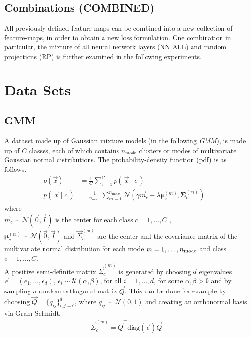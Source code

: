 \subsection{Combinations (COMBINED)}
All previously defined feature-maps can be combined into a new collection of feature-maps,
in order to obtain a new loss formulation.
One combination in particular, the mixture of all neural network layers (NN ALL) and random projections (RP) is further examined in the following experiments.


\section{Data Sets}
\label{sec:datasets}

\subsection{GMM}
\label{sec:datasetgmm}
A dataset made up of Gaussian mixture models (in the following \textit{GMM}), 
is made up of $C$ classes, each of which contains $n_\text{mode}$ clusters or modes of multivariate Gaussian normal distributions. The probability-density function (pdf) is as follows.
\begin{align}
\label{eqn:gmm_distr}
    p(\vec x) &= \frac 1 C \sum_{c=1}^C p(\, \vec x \mid c \,) \nonumber\\
    p(\, \vec x \mid c \,) &= \frac 1 {n_\text{mode}} \sum _{m=1}^{n_\text{mode}}
    \mathcal N (\gamma \vec m_c + \lambda \boldsymbol \mu_c^{(m)}, \boldsymbol \Sigma_c^{(m)}) \, ,
\end{align}
where \\
$\vec m_c \sim \mathcal N (\vec 0, \vec I)$ is the center for each class $c=1,\ldots, C$ ,\\
$\boldsymbol \mu_c^{(m)} \sim \mathcal N (\vec 0, \vec I)$ and
$\vec \Sigma_c^{(m)}$ are the center and the covariance matrix of the multivariate normal distribution
for each mode $m=1,\ldots, n_{\textnormal{mode}}$ and class $c=1,\ldots, C$.  \\
A positive semi-definite matrix $\vec \Sigma_c^{(m)}$ is generated by choosing $d$ eigenvalues $\vec e = (e_1, \ldots, e_d)$, $e_i \sim \mathcal U(\alpha, \beta)$, for all $i=1, \ldots, d$, for some $\alpha, \beta > 0$ and 
by sampling a random orthogonal matrix $\vec Q$. 
This can be done for example by choosing $\vec Q = \{q_{ij}\}_{i,j=0}^{d}$, 
where $q_{ij} \sim \mathcal N(0, 1)$
and creating an orthonormal basis via Gram-Schmidt. 
\begin{align*}
    \vec \Sigma_c^{(m)} = \vec Q^\top \text{diag}(\vec e) \vec Q
\end{align*}

